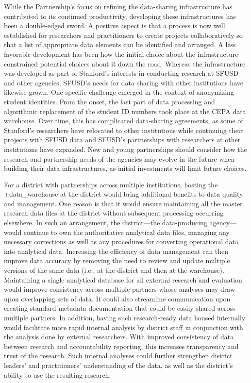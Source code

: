 \documentclass[
]{book}
\begin{document}
While the Partnership's focus on refining the data-sharing infrastructure has contributed to its continued productivity, developing these infrastructures has been a double-edged sword. A positive aspect is that a process is now well established for researchers and practitioners to create projects collaboratively so that a list of appropriate data elements can be identified and arranged. A less favorable development has been how the initial choice about the infrastructure constrained potential choices about it down the road. Whereas the infrastructure was developed as part of Stanford's interests in conducting research at SFUSD and other agencies, SFUSD's needs for data sharing with other institutions have likewise grown. One specific challenge emerged in the context of anonymizing student identities. From the onset, the last part of data processing and algorithmic replacement of the student ID numbers took place at the CEPA data warehouse. Over time, this has complicated data-sharing agreements, as some of Stanford's researchers have relocated to other institutions while continuing their projects with SFUSD data and SFUSD's partnerships with researchers at other institutions have expanded. New and young partnerships should consider how the research and partnership needs of the agencies may evolve in the future when building their data infrastructures, as initial investments will limit future choices.

For a district with partnerships across multiple institutions, hosting the +data\_warehouse\textbar{} at the district would bring additional benefits to data quality and management. One reason is that it would ensure maintaining all the master research data files at the district without subsequent processing occurring elsewhere. In such an arrangement, the district---the data-producing agency---would continue to own the authoritative analytical data files, managing any necessary corrections as well as any procedures for converting operational data into analytical data. Increasing the efficiency of data management can then improve data accuracy by removing the need to review and update multiple versions of the same data (i.e., at the district and then at the warehouse). Maintaining a single analytical database for all external research and evaluation would improve consistency across multiple partners whose analyses may draw upon overlapping sets of data. It could also streamline communication upon creating standard metadata documentation that could be easily shared across multiple partners. In addition, having such research-ready data housed internally would facilitate more rapid internal analysis by district staff in conjunction with the analysis done by external researchers. With improved consistency of data between research and accountability reporting, this increases transparency and trust of the research. Such internal analyses could further strengthen district leaders' and practitioners' understanding of the data, as well as the district's ability to use the resulting research.
\end{document}
